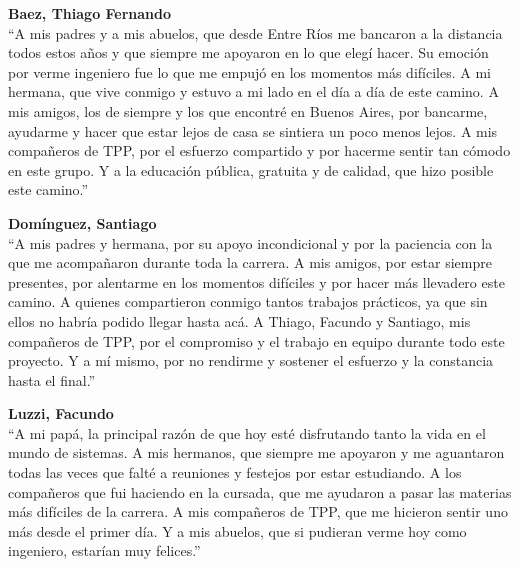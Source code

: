 \vspace{0.4cm}

\noindent\textbf{Baez, Thiago Fernando}\\
``A mis padres y a mis abuelos, que desde Entre Ríos me bancaron a la distancia todos estos años y que siempre me apoyaron en lo que elegí hacer. Su emoción por verme ingeniero fue lo que me empujó en los momentos más difíciles. A mi hermana, que vive conmigo y estuvo a mi lado en el día a día de este camino. A mis amigos, los de siempre y los que encontré en Buenos Aires, por bancarme, ayudarme y hacer que estar lejos de casa se sintiera un poco menos lejos. A mis compañeros de TPP, por el esfuerzo compartido y por hacerme sentir tan cómodo en este grupo. Y a la educación pública, gratuita y de calidad, que hizo posible este camino.''

\vspace{0.3cm}

\noindent\textbf{Domínguez, Santiago}\\
``A mis padres y hermana, por su apoyo incondicional y por la paciencia con la que me acompañaron durante toda la carrera. A mis amigos, por estar siempre presentes, por alentarme en los momentos difíciles y por hacer más llevadero este camino. A quienes compartieron conmigo tantos trabajos prácticos, ya que sin ellos no habría podido llegar hasta acá. A Thiago, Facundo y Santiago, mis compañeros de TPP, por el compromiso y el trabajo en equipo durante todo este proyecto. Y a mí mismo, por no rendirme y sostener el esfuerzo y la constancia hasta el final.''

\vspace{0.3cm}

\noindent\textbf{Luzzi, Facundo}\\
``A mi papá, la principal razón de que hoy esté disfrutando tanto la vida en el mundo de sistemas. A mis hermanos, que siempre me apoyaron y me aguantaron todas las veces que falté a reuniones y festejos por estar estudiando. A los compañeros que fui haciendo en la cursada, que me ayudaron a pasar las materias más difíciles de la carrera. A mis compañeros de TPP, que me hicieron sentir uno más desde el primer día. Y a mis abuelos, que si pudieran verme hoy como ingeniero, estarían muy felices.''

\vspace{0.3cm}

